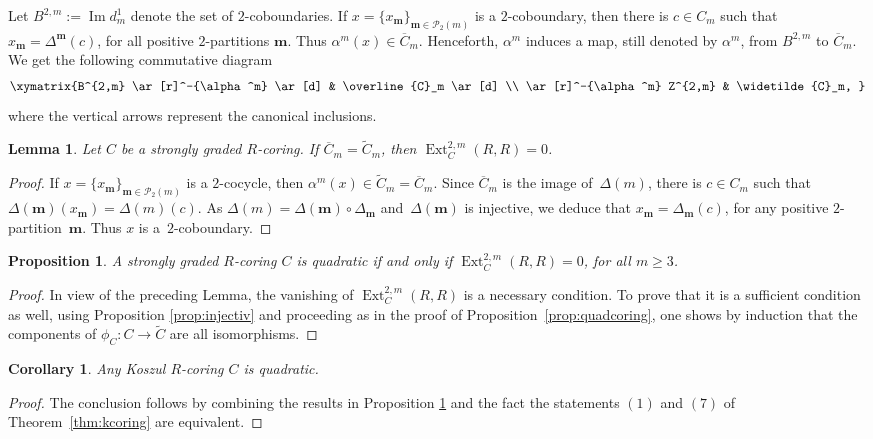 \documentclass[pdftex]{sigma}
\newcommand{\bs}[1]{\boldsymbol{#1}}
\newcommand{\ol}[1]{\overline{#1}}
\DeclareMathOperator{\im}{Im}
\newcommand{\br}[1]{\{ #1 \}}
\newcommand{\Pa}[2]{\mathscr{P}_{#2}(#1)}
\renewcommand{\^}[1]{\mbox{$^{\left( #1 \right)}$}}
\renewcommand{\_}[1]{\mbox{$_{\left( #1 \right)}$}}
\newcommand{\Ext}{\operatorname{Ext}}
\numberwithin{equation}{section}
\newtheorem{Corollary}[Theorem]{Corollary}
\newtheorem{Lemma}[Theorem]{Lemma}
\newtheorem{Proposition}[Theorem]{Proposition}
{ \theoremstyle{definition}
\newtheorem{Definition}[Theorem]{Definition}
\newtheorem{Remark}[Theorem]{Remark}
}
\begin{document}
Let $B^{2,m}:=\im d^1_m$ denote the set of $2$-coboundaries. If $x=\br{x_{\bs{m}}}_{\bs{m}\in\Pa{m}{2}}$ is a $2$-coboundary, then there is $c\in C_m$ such that $x_{\bs{m}}=\Delta^{\bs{m}}(c)$, for all positive $2$-partitions $\bs{m}$. Thus $\alpha^m(x)\in\ol{C}_m$. Henceforth, $\alpha^m$ induces a map, still denoted by $\alpha^m$, from $B^{2,m}$ to $\ol{C}_m$. We get the following commutative diagram{\samepage
\begin{gather*}
 \xymatrix{B^{2,m} \ar[r]^-{\alpha^m} \ar[d] & \ol{C}_m \ar[d] \\
 \ar[r]^-{\alpha^m} Z^{2,m} & \widetilde{C}_m,
 }
\end{gather*}
where the vertical arrows represent the canonical inclusions.}

\begin{Lemma}
 Let $C$ be a strongly graded $R$-coring. If $\ol{C}_m = \widetilde{C}_m$, then $\Ext^{2,m}_C(R,R)=0$.
\end{Lemma}

\begin{proof}
 If $x=\br{x_{\bs{m}}}_{\bs{m}\in\Pa{m}{2}}$ is a $2$-cocycle, then $\alpha^m(x)\in \widetilde{C}_m=\ol{C}_m$. Since $\ol{C}_m$ is the image of~$\Delta(m)$, there is $c\in C_m$ such that $\Delta(\bs{m})(x_{\bs{m}})=\Delta(m)(c)$. As $\Delta(m)=\Delta(\bs{m})\circ \Delta_{\bs{m}}$ and~$\Delta(\bs{m})$ is injective, we deduce that $x_{\bs{m}}= \Delta_{\bs{m}}(c)$, for any positive $2$-partition~$\bs{m}$. Thus $x$ is a~$2$-coboundary.
\end{proof}

\begin{Proposition} \label{prop:quadring} A strongly graded $R$-coring $C$ is quadratic if and only if $\operatorname{Ext}^{2,m}_C(R,R) =0$, for all $m \geq 3$.
\end{Proposition}

\begin{proof} In view of the preceding Lemma, the vanishing of $\operatorname{Ext}^{2,m}_C(R,R)$ is a necessary condition. To prove that it is a suf\/f\/icient condition as well, using Proposition \ref{prop:injectiv} and proceeding as in the proof of Proposition~\ref{prop:quadcoring}, one shows by induction that the components of $\phi_C\colon C\to\widetilde{C}$ are all isomorphisms.
\end{proof}

\begin{Corollary} \label{co:cquad}
Any Koszul $R$-coring $C$ is quadratic.
\end{Corollary}
\begin{proof}
The conclusion follows by combining the results in Proposition \ref{prop:quadring} and the fact the statements $(1)$ and $(7)$ of Theorem~\ref{thm:kcoring} are equivalent.
\end{proof}
\end{document}
